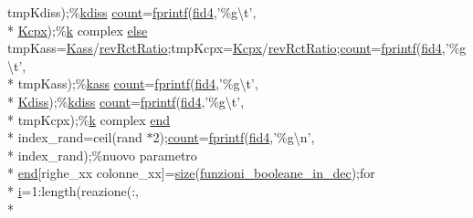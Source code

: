 \begin{DoxyCompactItemize}
tmp\-Kdiss);\%\hyperlink{a00112_acb874616f80abe1a595c7c9e12040cd5}{kdiss} \hyperlink{a00110_aa0a4866d2600caeb20cfacee8eefc922}{count}=\hyperlink{a00110_aa6dc40efe43a338c9ff278260d95b4d9}{fprintf}(\hyperlink{a00110_a28f0b3b80ef3c84a4a00660a307d2147}{fid4},'\%g\textbackslash{}t', \\*
\hyperlink{a00113_aaea32371e0f1645dcea44ce4d4a3d147}{Kcpx});\%\hyperlink{a00110_abf70355c2e58f64c6b18bda1b9bccfd7}{k} complex \hyperlink{a00031_af5946383720aa572eb93e1e63afc23c2}{else} tmp\-Kass=\hyperlink{a00113_a484afe97369bc993daaa71613dd2a665}{Kass}/\hyperlink{a00113_aa7d97d27bd1a172a2f0ad49ef13ef8ac}{rev\-Rct\-Ratio};tmp\-Kcpx=\hyperlink{a00113_aaea32371e0f1645dcea44ce4d4a3d147}{Kcpx}/\hyperlink{a00113_aa7d97d27bd1a172a2f0ad49ef13ef8ac}{rev\-Rct\-Ratio};\hyperlink{a00110_aa0a4866d2600caeb20cfacee8eefc922}{count}=\hyperlink{a00110_aa6dc40efe43a338c9ff278260d95b4d9}{fprintf}(\hyperlink{a00110_a28f0b3b80ef3c84a4a00660a307d2147}{fid4},'\%g\textbackslash{}t', \\*
tmp\-Kass);\%\hyperlink{a00112_a8d22b96a5ece64359002562ebc1fbfc5}{kass} \hyperlink{a00110_aa0a4866d2600caeb20cfacee8eefc922}{count}=\hyperlink{a00110_aa6dc40efe43a338c9ff278260d95b4d9}{fprintf}(\hyperlink{a00110_a28f0b3b80ef3c84a4a00660a307d2147}{fid4},'\%g\textbackslash{}t', \\*
\hyperlink{a00113_a51a314f9df0eaa4488a1b264d1de0173}{Kdiss});\%\hyperlink{a00112_acb874616f80abe1a595c7c9e12040cd5}{kdiss} \hyperlink{a00110_aa0a4866d2600caeb20cfacee8eefc922}{count}=\hyperlink{a00110_aa6dc40efe43a338c9ff278260d95b4d9}{fprintf}(\hyperlink{a00110_a28f0b3b80ef3c84a4a00660a307d2147}{fid4},'\%g\textbackslash{}t', \\*
tmp\-Kcpx);\%\hyperlink{a00110_abf70355c2e58f64c6b18bda1b9bccfd7}{k} complex \hyperlink{a00025_afb358f48b1646c750fb9da6c6585be2b}{end} \\*
index\-\_\-rand=ceil(rand $\ast$2);\hyperlink{a00110_aa0a4866d2600caeb20cfacee8eefc922}{count}=\hyperlink{a00110_aa6dc40efe43a338c9ff278260d95b4d9}{fprintf}(\hyperlink{a00110_a28f0b3b80ef3c84a4a00660a307d2147}{fid4},'\%g\textbackslash{}n', \\*
index\-\_\-rand);\%nuovo parametro \\*
\hyperlink{a00025_afb358f48b1646c750fb9da6c6585be2b}{end}\mbox{[}righe\-\_\-xx colonne\-\_\-xx\mbox{]}=\hyperlink{a00104_ae113ea7f9e515a12ac4b5595c6faf61e}{size}(\hyperlink{a00113_aca80ac3e93dabd95e623a51f90fb37b6}{funzioni\-\_\-booleane\-\_\-in\-\_\-dec});for \\*
\hyperlink{a00113_ad3efca1ea6e3333daf30719ee0501862}{i}=1\-:length(reazione(\-:, \\*

\end{DoxyCompactItemize}
